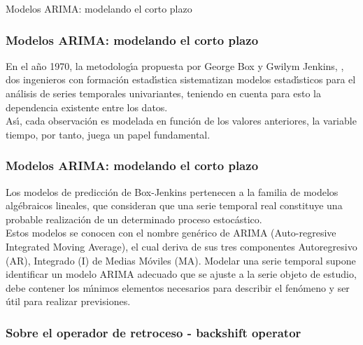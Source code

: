 \documentclass[spanish,xcolor=table]{beamer}
\begin{document}
\begin{section}{Modelos ARIMA: modelando el corto plazo}
\begin{frame}
\frametitle{Modelos ARIMA: modelando el corto plazo}

En el a\~no 1970, la metodolog\'{\i}a propuesta por George Box y Gwilym Jenkins, \cite{BoxJenkins} , dos ingenieros con formaci\'on estad\'{\i}stica sistematizan modelos estad\'{\i}sticos para el an\'alisis de series temporales univariantes, teniendo en cuenta para esto la dependencia existente entre los datos. \\
As\'{\i}, cada observaci\'on es modelada en funci\'on de los valores anteriores, la variable tiempo, por tanto, juega un papel fundamental. 
 
\end{frame}

\begin{frame}
\frametitle{Modelos ARIMA: modelando el corto plazo}

Los modelos de predicci\'on de Box-Jenkins pertenecen a la familia de modelos alg\'ebraicos lineales, que consideran que una serie temporal real constituye una probable realizaci\'on de un determinado proceso estoc\'astico.\\
\vspace{4mm}	
Estos modelos se conocen con el nombre gen\'erico de ARIMA (Auto-regresive Integrated Moving Average), el cual deriva de sus tres componentes Autoregresivo (AR), Integrado (I) de Medias M\'oviles (MA). Modelar una serie temporal supone identificar un modelo ARIMA adecuado que se ajuste a la serie objeto de estudio, debe contener los m\'{\i}nimos elementos necesarios para describir el fen\'omeno y ser \'util para realizar previsiones.
 
\end{frame}

\begin{frame}
\frametitle{Sobre el operador de retroceso - backshift operator}



\end{frame}
\end{section}
\end{document}
